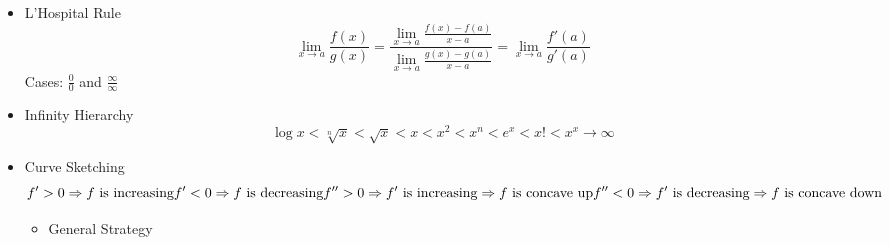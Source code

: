 	\begin{itemize}
		\item L'Hospital Rule
			\begin{equation}
				\lim_{x \rightarrow a} \frac{f(x)}{g(x)} = \frac{\lim_{x \rightarrow a} \frac{f(x) - f(a)}{x-a}}{\lim_{x \rightarrow a} \frac{g(x) - g(a)}{x-a}} = \lim_{x \rightarrow a} \frac{f'(a)}{g'(a)}
			\end{equation}
			Cases: $\frac{0}{0}$ and $\frac{\infty}{\infty}$
		\item Infinity Hierarchy
			\begin{equation}
				 \log x < \sqrt[n]{x} < \sqrt{x} < x < x^2 < x^n < e^x < x! < x^x \rightarrow \infty
			\end{equation}
		\item Curve Sketching
			\begin{equation}
				f'>0 \Rightarrow f \textrm{ is increasing} \\
				f'<0 \Rightarrow f \textrm{ is decreasing} \\
				f''>0 \Rightarrow f' \textrm{ is increasing} \Rightarrow f \textrm{ is concave up} \\
				f''<0 \Rightarrow f' \textrm{ is decreasing} \Rightarrow f \textrm{ is concave down}
			\end{equation}
			\begin{itemize}
				\item General Strategy
					\begin{enumerate}
					

\end{enumerate}
\end{itemize}
\end{itemize}
